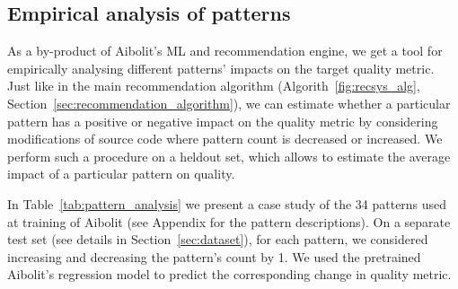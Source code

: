 
\subsection{Empirical analysis of patterns}

As a by-product of Aibolit's ML and recommendation
engine, we get a tool for empirically analysing different patterns' impacts on the target quality metric. Just
like in the main recommendation algorithm (Algorith~\ref{fig:recsys_alg}, Section~\ref{sec:recommendation_algorithm}), we can estimate whether a particular pattern has a positive or negative impact on the quality metric by considering modifications of source code where pattern count is decreased or increased. We perform such a procedure on a heldout set, which allows to estimate the average impact of a particular pattern on quality.

In Table~\ref{tab:pattern_analysis} we present a case study of the 34 patterns used at training of Aibolit (see Appendix for the pattern descriptions). On a separate test set (see details in Section~\ref{sec:dataset}), for each pattern, we considered increasing and decreasing the pattern's count by 1. We used the pretrained Aibolit's regression model to predict the corresponding change in quality metric.


